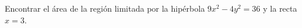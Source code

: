 \item Encontrar el área de la región limitada por la hipérbola $9x^2 - 4y^2 = 36$ y la recta $x = 3$.
